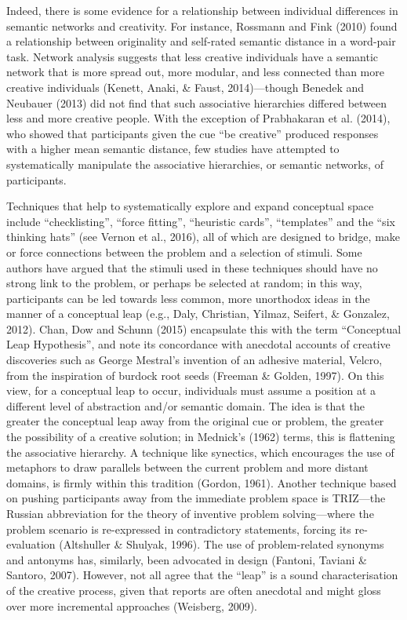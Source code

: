 \documentclass[english,man]{apa6}
\newcounter{author}
\begin{document}
Indeed, there is some evidence for a relationship between individual
differences in semantic networks and creativity. For instance, Rossmann
and Fink (2010) found a relationship between originality and self-rated
semantic distance in a word-pair task. Network analysis suggests that
less creative individuals have a semantic network that is more spread
out, more modular, and less connected than more creative individuals
(Kenett, Anaki, \& Faust, 2014)---though Benedek and Neubauer (2013) did
not find that such associative hierarchies differed between less and
more creative people. With the exception of Prabhakaran et al. (2014),
who showed that participants given the cue \enquote{be creative}
produced responses with a higher mean semantic distance, few studies
have attempted to systematically manipulate the associative hierarchies,
or semantic networks, of participants.

Techniques that help to systematically explore and expand conceptual
space include \enquote{checklisting}, \enquote{force fitting},
\enquote{heuristic cards}, \enquote{templates} and the \enquote{six
thinking hats} (see Vernon et al., 2016), all of which are designed to
bridge, make or force connections between the problem and a selection of
stimuli. Some authors have argued that the stimuli used in these
techniques should have no strong link to the problem, or perhaps be
selected at random; in this way, participants can be led towards less
common, more unorthodox ideas in the manner of a conceptual leap (e.g.,
Daly, Christian, Yilmaz, Seifert, \& Gonzalez, 2012). Chan, Dow and
Schunn (2015) encapsulate this with the term \enquote{Conceptual Leap
Hypothesis}, and note its concordance with anecdotal accounts of
creative discoveries such as George Mestral's invention of an adhesive
material, Velcro, from the inspiration of burdock root seeds (Freeman \&
Golden, 1997). On this view, for a conceptual leap to occur, individuals
must assume a position at a different level of abstraction and/or
semantic domain. The idea is that the greater the conceptual leap away
from the original cue or problem, the greater the possibility of a
creative solution; in Mednick's (1962) terms, this is flattening the
associative hierarchy. A technique like synectics, which encourages the
use of metaphors to draw parallels between the current problem and more
distant domains, is firmly within this tradition (Gordon, 1961). Another
technique based on pushing participants away from the immediate problem
space is TRIZ---the Russian abbreviation for the theory of inventive
problem solving---where the problem scenario is re-expressed in
contradictory statements, forcing its re-evaluation (Altshuller \&
Shulyak, 1996). The use of problem-related synonyms and antonyms has,
similarly, been advocated in design (Fantoni, Taviani \& Santoro, 2007).
However, not all agree that the \enquote{leap} is a sound
characterisation of the creative process, given that reports are often
anecdotal and might gloss over more incremental approaches (Weisberg,
2009).
\end{document}
